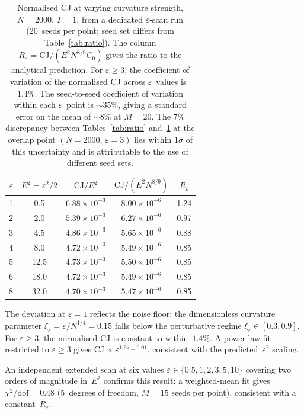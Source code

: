 \documentclass[12pt,a4paper]{article}
\theoremstyle{plain}
\theoremstyle{definition}
\theoremstyle{remark}
\newcommand{\CJ}{\mathrm{CJ}}
\begin{document}
\begin{table}[ht]
\centering
\caption{Normalised CJ at varying curvature strength, $N = 2000$,
$T = 1$, from a dedicated $\varepsilon$-scan run (20~seeds per
point; seed set differs from Table~\ref{tab:ratio}).
The column $R_\varepsilon = \CJ/(E^2 N^{8/9} C_0)$ gives
the ratio to the analytical prediction.  For $\varepsilon \geq 3$,
the coefficient of variation of the normalised CJ across
$\varepsilon$~values is~$1.4\%$.  The seed-to-seed coefficient
of variation within each $\varepsilon$~point is $\sim 35\%$,
giving a standard error on the mean of $\sim 8\%$ at $M = 20$.
The $7\%$ discrepancy between Tables~\ref{tab:ratio}
and~\ref{tab:epsilon} at the overlap point $(N = 2000,\,
\varepsilon = 3)$ lies within $1\sigma$ of this uncertainty
and is attributable to the use of different seed sets.}
\label{tab:epsilon}
\begin{tabular}{rcccc}
\toprule
$\varepsilon$ & $E^2 = \varepsilon^2/2$
& $\CJ/E^2$ & $\CJ / (E^2 N^{8/9})$ & $R_\varepsilon$ \\
\midrule
1 &  0.5 & $6.88 \times 10^{-3}$ & $8.00 \times 10^{-6}$ & 1.24 \\
2 &  2.0 & $5.39 \times 10^{-3}$ & $6.27 \times 10^{-6}$ & 0.97 \\
3 &  4.5 & $4.86 \times 10^{-3}$ & $5.65 \times 10^{-6}$ & 0.88 \\
4 &  8.0 & $4.72 \times 10^{-3}$ & $5.49 \times 10^{-6}$ & 0.85 \\
5 & 12.5 & $4.73 \times 10^{-3}$ & $5.50 \times 10^{-6}$ & 0.85 \\
6 & 18.0 & $4.72 \times 10^{-3}$ & $5.49 \times 10^{-6}$ & 0.85 \\
8 & 32.0 & $4.70 \times 10^{-3}$ & $5.47 \times 10^{-6}$ & 0.85 \\
\bottomrule
\end{tabular}
\end{table}

The deviation at $\varepsilon = 1$ reflects the noise floor: the
dimensionless curvature parameter
$\xi_{\varepsilon} = \varepsilon / N^{1/4} = 0.15$ falls below
the perturbative regime $\xi_{\varepsilon} \in [0.3, 0.9]$.  For
$\varepsilon \geq 3$, the normalised CJ is constant to
within~$1.4\%$.  A power-law fit restricted to $\varepsilon \geq 3$
gives $\CJ \propto \varepsilon^{1.97 \pm 0.01}$, consistent with
the predicted~$\varepsilon^2$ scaling.

An independent extended scan at six values $\varepsilon \in
\{0.5, 1, 2, 3, 5, 10\}$ covering two orders of magnitude in~$E^2$
confirms this result: a weighted-mean fit gives $\chi^2/\mathrm{dof}
= 0.48$ (5~degrees of freedom, $M = 15$ seeds per point),
consistent with a constant~$R_\varepsilon$.
\end{document}
